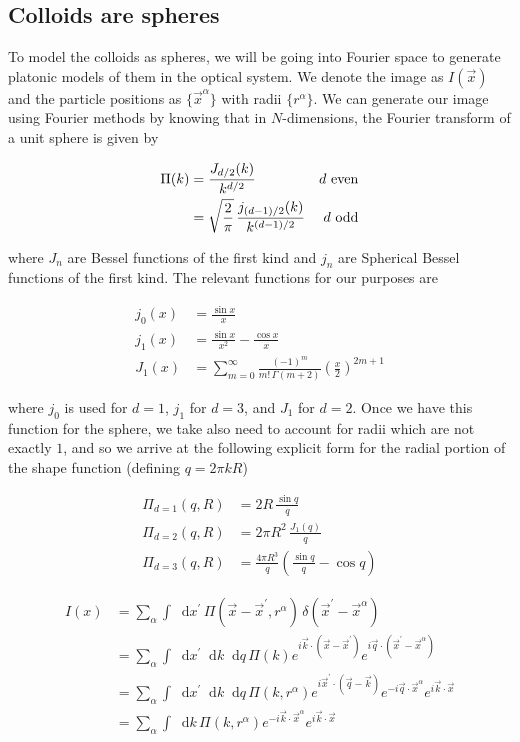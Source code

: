 \documentclass[twocolumn,amsmath,amssymb]{revtex4}
\newcommand*\diff{\mathop{}\!\mathrm{d}}
\begin{document}
\subsection{Colloids are spheres}

To model the colloids as spheres, we will be going into Fourier space to
generate platonic models of them in the optical system.  We denote the image as
$I(\vec{x})$ and the particle positions as $\{\vec{x}^{\alpha}\}$ with radii
$\{r^{\alpha}\}$.  We can generate our image using Fourier methods by knowing that
in $N$-dimensions, the Fourier transform of a unit sphere is given by

\begin{align*}
    \Pi(k) &= \frac{J_{d/2}(k)}{k^{d/2}} & d\,\,\rm{even} \\
           &= \sqrt{\frac{2}{\pi}}\, \frac{j_{(d-1)/2}(k)}{k^{(d-1)/2}} &d\,\,\rm{odd}
\end{align*}

where $J_n$ are Bessel functions of the first kind and $j_n$ are Spherical
Bessel functions of the first kind.  The relevant functions for our purposes
are

\begin{align*}
    j_0(x) &= \frac{\sin{x}}{x} \\
    j_1(x) &= \frac{\sin{x}}{x^2} - \frac{\cos{x}}{x} \\
    J_1(x) &= \sum_{m=0}^{\infty} \frac{(-1)^m}{m!\,\Gamma(m+2)} \left(\frac{x}{2}\right)^{2m+1}
\end{align*}

where $j_0$ is used for $d=1$, $j_1$ for $d=3$, and $J_1$ for $d=2$.  Once we
have this function for the sphere, we take also need to account for radii which
are not exactly $1$, and so we arrive at the following explicit form for the
radial portion of the shape function (defining $q = 2\pi k R$)

\begin{align*}
    \Pi_{d=1}(q,R) &= 2 R \,\frac{\sin{q}}{q} \\
    \Pi_{d=2}(q,R) &= 2 \pi R^2 \,\frac{J_1(q)} {q} \\
    \Pi_{d=3}(q,R) &= \frac{4\pi R^3}{q}\left(\frac{\sin{q}}{q} -\cos{q}\right) 
\end{align*}

\begin{align*}
    I(x) &= \sum_{\alpha} \int \diff x^{\prime}\, \Pi(\vec{x} - \vec{x}^{\prime}, r^{\alpha}) \,\delta(\vec{x}^{\prime} - \vec{x}^{\alpha}) \\
         &= \sum_{\alpha} \int \diff x^{\prime} \diff k \diff q\, \Pi(k) e^{i \vec{k} \cdot ( \vec{x} - \vec{x}^{\prime})} e^{i \vec{q} \cdot (\vec{x}^{\prime} - \vec{x}^{\alpha})} \\
         &= \sum_{\alpha} \int \diff x^{\prime} \diff k \diff q\, \Pi(k, r^{\alpha}) e^{i \vec{x}^{\prime} \cdot ( \vec{q} - \vec{k})} e^{- i \vec{q} \cdot \vec{x}^{\alpha}} e^{i \vec{k} \cdot \vec{x}} \\
         &= \sum_{\alpha} \int \diff k\, \Pi(k, r^{\alpha}) e^{ - i \vec{k} \cdot \vec{x}^{\alpha}} e^{ i \vec{k} \cdot \vec{x}}
\end{align*}
\end{document}
